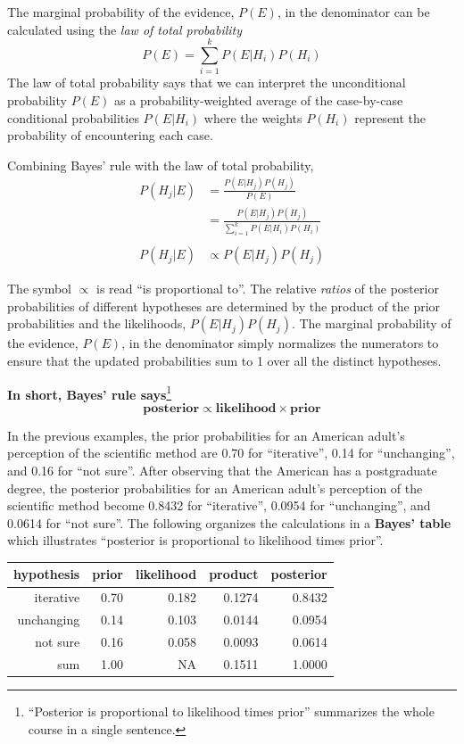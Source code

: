\documentclass[
]{book}
\theoremstyle{definition}
\theoremstyle{definition}
\theoremstyle{definition}
\theoremstyle{remark}
\begin{document}
The marginal probability of the evidence, \(P(E)\), in the denominator can be calculated using the \emph{law of total probability}
\[
P(E) = \sum_{i=1}^k P(E|H_i) P(H_i)
\]
The law of total probability says that we can interpret the unconditional probability \(P(E)\) as a probability-weighted average of the case-by-case conditional probabilities \(P(E|H_i)\) where the weights \(P(H_i)\) represent the probability of encountering each case.

Combining Bayes' rule with the law of total probability,
\begin{align*}
P(H_j |E) & = \frac{P(E|H_j)P(H_j)}{P(E)}\\
& = \frac{P(E|H_j)P(H_j)}{\sum_{i=1}^k P(E|H_i) P(H_i)}\\
& \\
P(H_j |E) & \propto P(E|H_j)P(H_j)
\end{align*}

The symbol \(\propto\) is read ``is proportional to''. The relative \emph{ratios} of the posterior probabilities of different hypotheses are determined by the product of the prior probabilities and the likelihoods, \(P(E|H_j)P(H_j)\). The marginal probability of the evidence, \(P(E)\), in the denominator simply normalizes the numerators to ensure that the updated probabilities sum to 1 over all the distinct hypotheses.

\textbf{In short, Bayes' rule says}\footnote{``Posterior is proportional to likelihood times prior'' summarizes the whole course in a single sentence.}
\[
\textbf{posterior} \propto \textbf{likelihood} \times \textbf{prior}
\]

In the previous examples, the prior probabilities for an American adult's perception of the scientific method are 0.70 for ``iterative'', 0.14 for ``unchanging'', and 0.16 for ``not sure''. After observing that the American has a postgraduate degree, the posterior probabilities for an American adult's perception of the scientific method become 0.8432 for ``iterative'', 0.0954 for ``unchanging'', and 0.0614 for ``not sure''. The following organizes the calculations in a \textbf{Bayes' table} which illustrates ``posterior is proportional to likelihood times prior''.

\begin{tabular}{r|r|r|r|r}
\hline
hypothesis & prior & likelihood & product & posterior\\
\hline
iterative & 0.70 & 0.182 & 0.1274 & 0.8432\\
\hline
unchanging & 0.14 & 0.103 & 0.0144 & 0.0954\\
\hline
not sure & 0.16 & 0.058 & 0.0093 & 0.0614\\
\hline
sum & 1.00 & NA & 0.1511 & 1.0000\\
\hline
\end{tabular}
\end{document}
